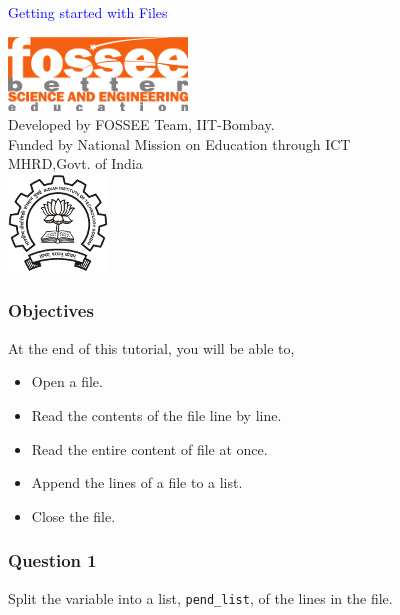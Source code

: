 \documentclass[presentation]{beamer}
\title{}
\author{FOSSEE}
\date{}
\begin{document}
\begin{frame}

\begin{center}
\vspace{12pt}
\textcolor{blue}{\huge Getting started with Files}
\end{center}
\vspace{18pt}
\begin{center}
\vspace{10pt}
\includegraphics[scale=0.95]{../images/fossee-logo.png}\\
\vspace{5pt}
\scriptsize Developed by FOSSEE Team, IIT-Bombay. \\ 
\scriptsize Funded by National Mission on Education through ICT\\
\scriptsize  MHRD,Govt. of India\\
\includegraphics[scale=0.30]{../images/iitb-logo.png}\\
\end{center}
\end{frame}
\begin{frame}
\frametitle{Objectives}
\label{sec-2}

  At the end of this tutorial, you will be able to, 

\begin{itemize}
\item Open a file.
\item Read the contents of the file line by line.
\item Read the entire content of file at once.
\item Append the lines of a file to a list.
\item Close the file.
\end{itemize}
\end{frame}
\begin{frame}
\frametitle{Question 1}
\label{sec-3}

  Split the variable into a list, \texttt{pend\_list}, of the lines in the
  file.
\end{frame}
\end{document}
